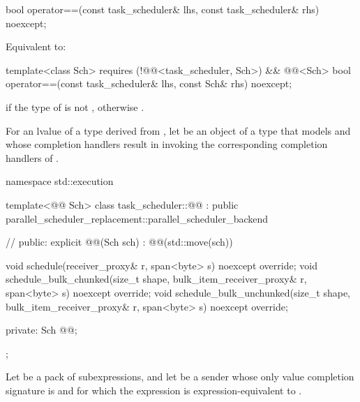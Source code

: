 %
\begin{itemdecl}
bool operator==(const task_scheduler& lhs, const task_scheduler& rhs) noexcept;
\end{itemdecl}
\begin{itemdescr}
\pnum
\effects
Equivalent to: 
\end{itemdescr}

%
\begin{itemdecl}
template<class Sch>
  requires (!@@<task_scheduler, Sch>)
        && @@<Sch>
bool operator==(const task_scheduler& lhs, const Sch& rhs) noexcept;
\end{itemdecl}
\begin{itemdescr}
\pnum
\returns
{} if the type of  is not ,
otherwise .
\end{itemdescr}

\pnum
For an lvalue  of a type derived from ,
let  be an object of a type
that models  and
whose completion handlers result in
invoking the corresponding completion handlers of .
\begin{codeblock}
namespace std::execution {
  template<@@ Sch>
  class task_scheduler::@@
    : public parallel_scheduler_replacement::parallel_scheduler_backend {       // \expos
  public:
    explicit @@(Sch sch) : @@(std::move(sch)) {}

    void schedule(receiver_proxy& r, span<byte> s) noexcept override;
    void schedule_bulk_chunked(size_t shape, bulk_item_receiver_proxy& r,
                               span<byte> s) noexcept override;
    void schedule_bulk_unchunked(size_t shape, bulk_item_receiver_proxy& r,
                                 span<byte> s) noexcept override;

  private:
    Sch @@;
  };
}
\end{codeblock}

\pnum
Let  be a pack of subexpressions, and
let  be a sender
whose only value completion signature is  and
for which the expression
is expression-equivalent to
.

